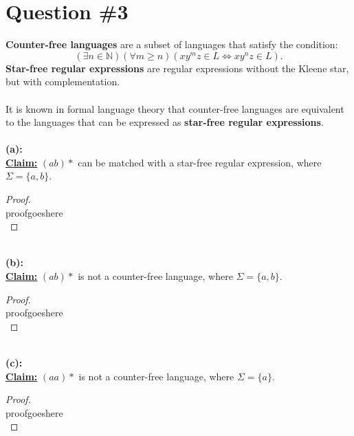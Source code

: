 \documentclass[12pt]{article}
\begin{document}
\section*{Question \#3}
\textbf{Counter-free languages} are a subset of languages that satisfy the condition:
\[
    (\exists n \in \mathbb{N})(\forall m \geq n)(xy^mz \in L \iff xy^nz \in L) \text{.}
\]
\textbf{Star-free regular expressions} are regular expressions without the Kleene star, but with complementation. \\
\\
It is known in formal language theory that counter-free languages are equivalent to the languages that can be expressed as \textbf{star-free regular expressions}. \\
\\
\textbf{(a):} \\
\textbf{\underline{Claim:}} $(ab)*$ can be matched with a star-free regular expression, where $\Sigma = \{ a, b \}$.
\begin{proof}
\leavevmode\\
    proofgoeshere \\
\end{proof}
\leavevmode\\
\textbf{(b):} \\
\textbf{\underline{Claim:}} $(ab)*$ is not a counter-free language, where $\Sigma = \{ a, b \} $. 
\begin{proof}
\leavevmode\\
    proofgoeshere \\
\end{proof}
\leavevmode\\
\textbf{(c):} \\
\textbf{\underline{Claim:}} $(aa)*$ is not a counter-free language, where $\Sigma = \{ a \} $. 
\begin{proof}
\leavevmode\\
    proofgoeshere \\
\end{proof}
\pagebreak
\end{document}
